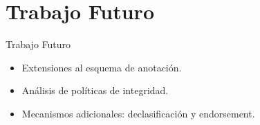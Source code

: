 \section{Trabajo Futuro}
\begin{frame}{Trabajo Futuro}
	\begin{block}{}
	\begin{itemize}
	  \item Extensiones al esquema de anotación.
	  \item Análisis de políticas de integridad.
	  \item Mecanismos adicionales: declasificación y endorsement.
	\end{itemize}
	\end{block}
\end{frame}